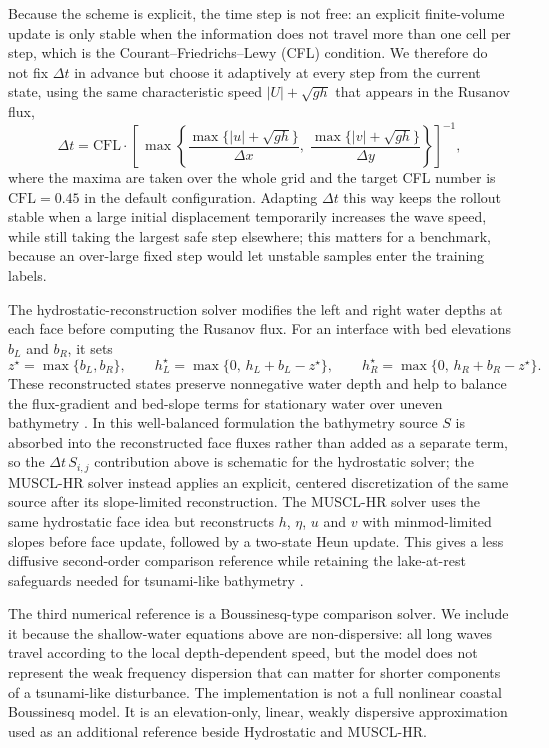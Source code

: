 Because the scheme is explicit, the time step is not free: an explicit finite-volume update is only stable when the information does not travel more than one cell per step, which is the Courant--Friedrichs--Lewy (CFL) condition. We therefore do not fix $\Delta t$ in advance but choose it adaptively at every step from the current state, using the same characteristic speed $|U| + \sqrt{gh}$ that appears in the Rusanov flux,
\[
\Delta t = \mathrm{CFL} \cdot \left[\,\max \! \left\{\frac{\max\{|u| + \sqrt{gh}\}}{\Delta x},\; \frac{\max\{|v| +  \sqrt{gh}\}}{\Delta y} \right\} \right] ^ {-1},
\]
where the maxima are taken over the whole grid and the target CFL number is $\mathrm{CFL} = 0.45$ in the default configuration. Adapting $\Delta t$ this way keeps the rollout stable when a large initial displacement temporarily increases the wave speed, while still taking the largest safe step elsewhere; this matters for a benchmark, because an over-large fixed step would let unstable samples enter the training labels.

The hydrostatic-reconstruction solver modifies the left and right water depths at each face before computing the Rusanov flux. For an interface with bed elevations $b_L$ and $b_R$, it sets
\[
z ^ \star = \max\{b_L, b_R\}, \qquad
h_L ^ \star = \max\{0,\, h_L + b_L - z ^ \star\}, \qquad
h_R ^ \star = \max\{0,\, h_R + b_R - z ^ \star\}.
\]
These reconstructed states preserve nonnegative water depth and help to balance the flux-gradient and bed-slope terms for stationary water over uneven bathymetry \citep{audusse2004hydrostatic}. In this well-balanced formulation the bathymetry source $S$ is absorbed into the reconstructed face fluxes rather than added as a separate term, so the $\Delta t\, S_{i, j}$ contribution above is schematic for the hydrostatic solver; the MUSCL-HR solver instead applies an explicit, centered discretization of the same source after its slope-limited reconstruction. The MUSCL-HR solver uses the same hydrostatic face idea but reconstructs $h$, $\eta$, $u$ and $v$ with minmod-limited slopes before face update, followed by a two-state Heun update. This gives a less diffusive second-order comparison reference while retaining the lake-at-rest safeguards needed for tsunami-like bathymetry \citep{clain2016secondorder, hou2015muscl}.

The third numerical reference is a Boussinesq-type comparison solver. We include it because the shallow-water equations above are non-dispersive: all long waves travel according to the local depth-dependent speed, but the model does not represent the weak frequency dispersion that can matter for shorter components of a tsunami-like disturbance. The implementation is not a full nonlinear coastal Boussinesq model. It is an elevation-only, linear, weakly dispersive approximation used as an additional reference beside Hydrostatic and MUSCL-HR.

